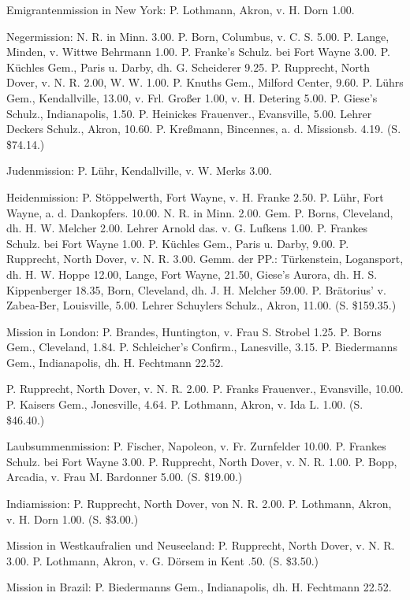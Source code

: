 Emigrantenmission in New York: P. Lothmann, Akron, v. H. Dorn 1.00.

Negermission: N. R. in Minn. 3.00. P. Born, Columbus, v. C. S. 5.00. P. Lange, Minden, v. Wittwe Behrmann 1.00. P. Franke’s Schulz. bei Fort Wayne 3.00. P. Küchles Gem., Paris u. Darby, dh. G. Scheiderer 9.25. P. Rupprecht, North Dover, v. N. R. 2.00, W. W. 1.00. P. Knuths Gem., Milford Center, 9.60. P. Lührs Gem., Kendallville, 13.00, v. Frl. Großer 1.00, v. H. Detering 5.00. P. Giese’s Schulz., Indianapolis, 1.50. P. Heinickes Frauenver., Evansville, 5.00. Lehrer Deckers Schulz., Akron, 10.60. P. Kreßmann, Bincennes, a. d. Missionsb. 4.19. (S. \$74.14.)

Judenmission: P. Lühr, Kendallville, v. W. Merks 3.00.

Heidenmission: P. Stöppelwerth, Fort Wayne, v. H. Franke 2.50. P. Lühr, Fort Wayne, a. d. Dankopfers. 10.00. N. R. in Minn. 2.00. Gem. P. Borns, Cleveland, dh. H. W. Melcher 2.00. Lehrer Arnold das. v. G. Lufkens 1.00. P. Frankes Schulz. bei Fort Wayne 1.00. P. Küchles Gem., Paris u. Darby, 9.00. P. Rupprecht, North Dover, v. N. R. 3.00. Gemm. der PP.: Türkenstein, Logansport, dh. H. W. Hoppe 12.00, Lange, Fort Wayne, 21.50, Giese’s Aurora, dh. H. S. Kippenberger 18.35, Born, Cleveland, dh. J. H. Melcher 59.00. P. Brätorius’ v. Zabea-Ber, Louisville, 5.00. Lehrer Schuylers Schulz., Akron, 11.00. (S. \$159.35.)

Mission in London: P. Brandes, Huntington, v. Frau S. Strobel 1.25. P. Borns Gem., Cleveland, 1.84. P. Schleicher’s Confirm., Lanesville, 3.15. P. Biedermanns Gem., Indianapolis, dh. H. Fechtmann 22.52.

P. Rupprecht, North Dover, v. N. R. 2.00. P. Franks Frauenver., Evansville, 10.00. P. Kaisers Gem., Jonesville, 4.64. P. Lothmann, Akron, v. Ida L. 1.00. (S. \$46.40.)

Laubsummenmission: P. Fischer, Napoleon, v. Fr. Zurnfelder 10.00. P. Frankes Schulz. bei Fort Wayne 3.00. P. Rupprecht, North Dover, v. N. R. 1.00. P. Bopp, Arcadia, v. Frau M. Bardonner 5.00. (S. \$19.00.)

Indiamission: P. Rupprecht, North Dover, von N. R. 2.00. P. Lothmann, Akron, v. H. Dorn 1.00. (S. \$3.00.)

Mission in Westkaufralien und Neuseeland: P. Rupprecht, North Dover, v. N. R. 3.00. P. Lothmann, Akron, v. G. Dörsem in Kent .50. (S. \$3.50.)

Mission in Brazil: P. Biedermanns Gem., Indianapolis, dh. H. Fechtmann 22.52.


